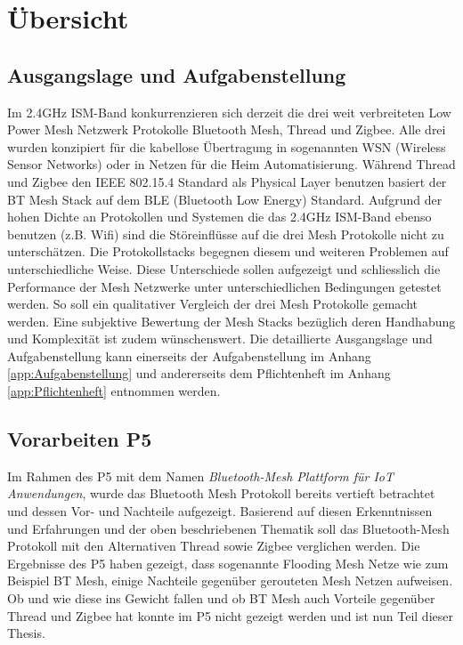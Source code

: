 \clearpage

\section{Übersicht}\label{sec:Uebersicht}

\subsection{Ausgangslage und Aufgabenstellung}\label{subsec:AusgangslageundAufgabenstellung}

Im 2.4GHz ISM-Band kon­kur­ren­zie­ren sich derzeit die drei weit verbreiteten Low Power Mesh Netzwerk Protokolle Bluetooth Mesh, Thread und Zigbee.
Alle drei wurden konzipiert für die kabellose Übertragung in sogenannten WSN (Wireless Sensor Networks) oder in Netzen für die Heim Automatisierung.
Während Thread und Zigbee den IEEE 802.15.4 Standard als Physical Layer benutzen basiert der BT Mesh Stack auf dem BLE (Bluetooth Low Energy) Standard.
Aufgrund der hohen Dichte an Protokollen und Systemen die das 2.4GHz ISM-Band ebenso benutzen (z.B. Wifi) sind die Störeinflüsse auf die drei Mesh Protokolle nicht zu unterschätzen.
Die Protokollstacks begegnen diesem und weiteren Problemen auf unterschiedliche Weise.
Diese Unterschiede sollen aufgezeigt und schliesslich die Performance der Mesh Netzwerke unter unterschiedlichen Bedingungen getestet werden.
So soll ein qualitativer Vergleich der drei Mesh Protokolle gemacht werden.
Eine subjektive Bewertung der Mesh Stacks bezüglich deren Handhabung und Komplexität ist zudem wünschenswert.
Die detaillierte Ausgangslage und Aufgabenstellung kann einerseits der Aufgabenstellung im Anhang \ref{app:Aufgabenstellung} und andererseits dem Pflichtenheft im Anhang \ref{app:Pflichtenheft} entnommen werden.

\subsection{Vorarbeiten P5}\label{subsec:VorarbeitenP5}
Im Rahmen des P5 mit dem Namen \textit{Bluetooth-Mesh Plattform für IoT Anwendungen}, wurde das Bluetooth Mesh Protokoll bereits vertieft betrachtet und dessen Vor- und Nachteile aufgezeigt. 
Basierend auf diesen Erkenntnissen und Erfahrungen und der oben beschriebenen Thematik soll das Bluetooth-Mesh Protokoll mit den Alternativen Thread sowie Zigbee verglichen werden.
Die Ergebnisse des P5 haben gezeigt, dass sogenannte Flooding Mesh Netze wie zum Beispiel BT Mesh, einige Nachteile gegenüber gerouteten Mesh Netzen aufweisen. Ob und wie diese ins Gewicht fallen und ob BT Mesh auch Vorteile gegenüber Thread und Zigbee hat konnte im P5 nicht gezeigt werden und ist nun Teil dieser Thesis.

